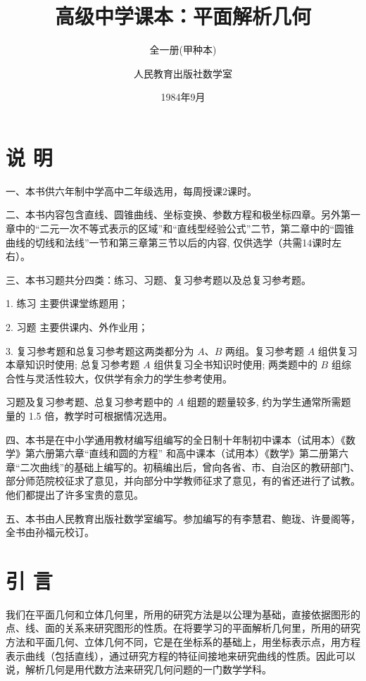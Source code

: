 \documentclass[lang=cn,newtx,12pt,scheme=chinese]{elegantbook}
\title{高级中学课本：平面解析几何}
\subtitle{全一册(甲种本)}
\author{人民教育出版社数学室}
\institute{人民教育出版社}
\date{1984年9月}
\begin{document}
\maketitle

\chapter*{说 明}

  一、本书供六年制中学高中二年级选用，每周授课2课时。

  二、本书内容包含直线、圆锥曲线、坐标变换、参数方程和极坐标四章。另外第一章中的“二元一次不等式表示的区域”和“直线型经验公式”二节，第二章中的“圆锥曲线的切线和法线”一节和第三章第三节以后的内容, 仅供选学（共需14课时左右）。

  三、本书习题共分四类：练习、习题、复习参考题以及总复习参考题。

  1. 练习 主要供课堂练题用；

  2. 习题 主要供课内、外作业用；

  3. 复习参考题和总复习参考题这两类都分为 \(A\text{、}B\) 两组。复习参考题 \(A\) 组供复习本章知识时使用; 总复习参考题 \(A\) 组供复习全书知识时使用; 两类题中的 \(B\) 组综合性与灵活性较大，仅供学有余力的学生参考使用。

  习题及复习参考题、总复习参考题中的 \(A\) 组题的题量较多, 约为学生通常所需题量的 1.5 倍，教学时可根据情况选用。

  四、本书是在中小学通用教材编写组编写的全日制十年制初中课本（试用本）《数学》第六册第六章“直线和圆的方程” 和高中课本（试用本）《数学》第二册第六章“二次曲线”的基础上编写的。初稿编出后，曾向各省、市、自治区的教研部门、部分师范院校征求了意见，并向部分中学教师征求了意见，有的省还进行了试教。他们都提出了许多宝贵的意见。

  五、本书由人民教育出版社数学室编写。参加编写的有李慧君、鲍珑、许曼阁等，全书由孙福元校订。

\frontmatter

\tableofcontents

\mainmatter

\chapter*{引 言}

我们在平面几何和立体几何里，所用的研究方法是以公理为基础，直接依据图形的点、线、面的关系来研究图形的性质。在将要学习的平面解析几何里，所用的研究方法和平面几何、立体几何不同，它是在坐标系的基础上，用坐标表示点，用方程表示曲线（包括直线），通过研究方程的特征间接地来研究曲线的性质。因此可以说，解析几何是用代数方法来研究几何问题的一门数学学科。
\end{document}
